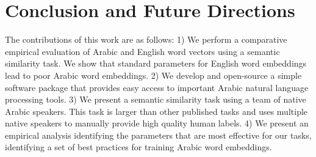 \section{Conclusion and Future Directions}
\label{sec:conclusion}

The contributions of this work are as follows: 1) We perform a comparative empirical evaluation of Arabic and English word vectors using a semantic similarity task. We show that standard parameters for English word embeddings lead to poor Arabic word embeddings. 2) We develop and open-source a simple software package that provides easy access to important Arabic natural language processing tools. 3) We present a semantic similarity task using a team of native Arabic speakers. This task is larger than other published tasks and uses multiple native speakers to manually provide high quality human labels. 4) We present an empirical analysis identifying the parameters that are most effective for our tasks, identifying a set of best practices for training Arabic word embeddings.

